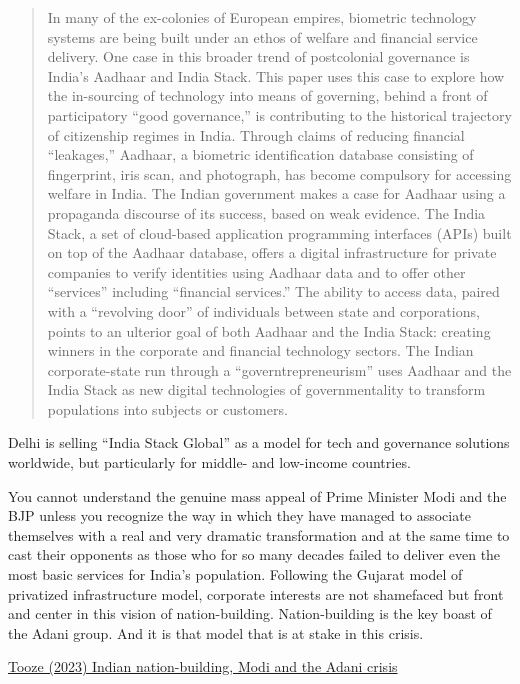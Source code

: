 \documentclass[
]{book}
\begin{document}
\begin{quote}
In many of the ex-colonies of European empires, biometric technology systems are being built under an ethos of welfare and financial service delivery. One case in this broader trend of postcolonial governance is India's Aadhaar and India Stack. This paper uses this case to explore how the in-sourcing of technology into means of governing, behind a front of participatory ``good governance,'' is contributing to the historical trajectory of citizenship regimes in India. Through claims of reducing financial ``leakages,'' Aadhaar, a biometric identification database consisting of fingerprint, iris scan, and photograph, has become compulsory for accessing welfare in India. The Indian government makes a case for Aadhaar using a propaganda discourse of its success, based on weak evidence. The India Stack, a set of cloud-based application programming interfaces (APIs) built on top of the Aadhaar database, offers a digital infrastructure for private companies to verify identities using Aadhaar data and to offer other ``services'' including ``financial services.'' The ability to access data, paired with a ``revolving door'' of individuals between state and corporations, points to an ulterior goal of both Aadhaar and the India Stack: creating winners in the corporate and financial technology sectors. The Indian corporate-state run through a ``governtrepreneurism'' uses Aadhaar and the India Stack as new digital technologies of governmentality to transform populations into subjects or customers.
\end{quote}

Delhi is selling ``India Stack Global'' as a model for tech and governance solutions worldwide, but particularly for middle- and low-income countries.

You cannot understand the genuine mass appeal of Prime Minister Modi and the BJP unless you recognize the way in which they have managed to associate themselves with a real and very dramatic transformation and at the same time to cast their opponents as those who for so many decades failed to deliver even the most basic services for India's population. Following the Gujarat model of privatized infrastructure model, corporate interests are not shamefaced but front and center in this vision of nation-building. Nation-building is the key boast of the Adani group. And it is that model that is at stake in this crisis.

\href{https://adamtooze.substack.com/p/chartbook-193-indian-nation-building}{Tooze (2023) Indian nation-building, Modi and the Adani crisis}
\end{document}
